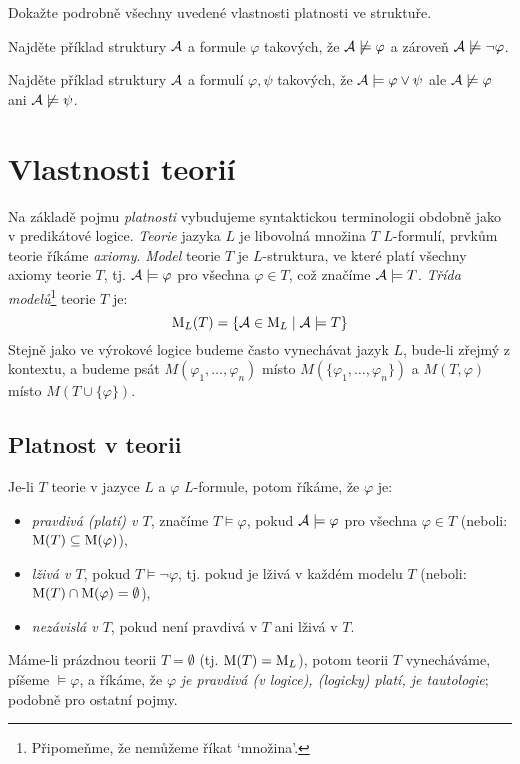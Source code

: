 \begin{exercise}
    Dokažte podrobně všechny uvedené vlastnosti platnosti ve struktuře.
\end{exercise}

\begin{exercise}
    Najděte příklad struktury $\mathcal{A}$ a formule $\varphi$ takových, že $\mathcal{A}\not\models\varphi$ a zároveň $\mathcal{A}\not\models\neg\varphi$.
\end{exercise}

\begin{exercise}
    Najděte příklad struktury $\mathcal{A}$ a formulí $\varphi,\psi$ takových, že $\mathcal{A}\models\varphi\lor\psi$ ale $\mathcal{A}\not\models\varphi$ ani $\mathcal{A}\not\models\psi$.
\end{exercise}

\section{Vlastnosti teorií}

Na základě pojmu \emph{platnosti} vybudujeme syntaktickou terminologii obdobně jako v predikátové logice. \emph{Teorie} jazyka $L$ je libovolná množina $T$ $L$-formulí, prvkům teorie říkáme \emph{axiomy}. \emph{Model} teorie $T$ je $L$-struktura, ve které platí všechny axiomy teorie $T$, tj. $\mathcal{A}\models\varphi$ pro všechna $\varphi\in T$, což značíme $\mathcal{A}\models T$. \emph{Třída modelů}\footnote{Připomeňme, že nemůžeme říkat `množina'.} teorie $T$ je:
$$
\operatorname{M}_L(T)=\{\mathcal{A}\in\operatorname{M}_L\mid\mathcal{A}\models T\}
$$
Stejně jako ve výrokové logice budeme často vynechávat jazyk $L$, bude-li zřejmý z kontextu, a budeme psát $M(\varphi_1,\dots,\varphi_n)$ místo $M(\{\varphi_1,\dots,\varphi_n\})$ a $M(T,\varphi)$ místo $M(T\cup\{\varphi\})$.

\subsection{Platnost v teorii}

Je-li $T$ teorie v jazyce $L$ a $\varphi$ $L$-formule, potom říkáme, že $\varphi$ je: 
\begin{itemize}
    \item \emph{pravdivá (platí) v $T$}, značíme $T\models\varphi$, pokud $\mathcal{A}\models\varphi$ pro všechna $\varphi\in T$ (neboli: $\operatorname{M}(T)\subseteq\operatorname{M}(\varphi)$),
    \item \emph{lživá v $T$}, pokud $T\models\neg\varphi$, tj. pokud je lživá v každém modelu $T$ (neboli: $\operatorname{M}(T)\cap\operatorname{M}(\varphi)=\emptyset$),
    \item \emph{nezávislá v $T$}, pokud není pravdivá v $T$ ani lživá v $T$.
\end{itemize}
Máme-li prázdnou teorii $T=\emptyset$ (tj. $\operatorname{M}(T)=\operatorname{M}_L$), potom teorii $T$ vynecháváme, píšeme $\models\varphi$, a říkáme, že $\varphi$ \emph{je pravdivá (v logice), (logicky) platí, je tautologie}; podobně pro ostatní pojmy.

